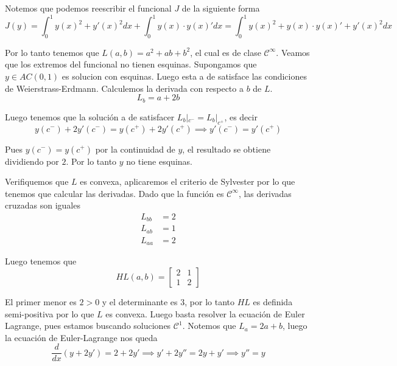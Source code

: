 \documentclass[a4paper,oneside,10.5pt]{USMArt}
\begin{document}
\begin{sol}
  Notemos que podemos reescribir el funcional $J$ de la siguiente forma
  \begin{equation*}
    J(y) = \int_{0}^{1} y(x)^{2} + y'(x)^{2} dx + \int_{0}^{1} y(x) \cdot y(x)' dx = \int_{0}^{1} y(x)^{2} + y(x) \cdot y(x)' + y'(x)^{2} dx
  \end{equation*}

  Por lo tanto tenemos que $L(a, b) = a^{2} + ab + b^{2}$, el cual es de clase $\mathcal{C}^{\infty}$. Veamos que los
  extremos del funcional no tienen esquinas. Supongamos que $y \in AC(0,1)$ es solucion con esquinas.
  Luego esta a de satisface las condiciones de Weierstrass-Erdmann. Calculemos la derivada con respecto a $b$ de $L$.
  \begin{equation*}
    L_{b} = a + 2b
  \end{equation*}


  Luego tenemos que la solución a de satisfacer $L_{b}|_{c^{-}} = L_{b}|_{c^{+}}$, es decir
  \begin{equation*}
    y(c^{-}) + 2y'(c^{-}) = y(c^{+}) + 2y'(c^{+}) \implies y'(c^{-}) = y'(c^{+})
  \end{equation*}

  Pues $y(c^{-}) = y(c^{+})$ por la continuidad de $y$, el resultado se obtiene dividiendo por $2$. Por lo tanto
  $y$ no tiene esquinas.

  Verifiquemos que $L$ es convexa, aplicaremos el criterio de Sylvester por lo que tenemos que calcular las derivadas.
  Dado que la función es $\mathcal{C}^{\infty}$, las derivadas cruzadas son iguales
  \begin{align*}
    L_{bb} &= 2\\
    L_{ab} &= 1\\
    L_{aa} &= 2
  \end{align*}

  Luego tenemos que
  \begin{equation*}
    HL(a, b) = \begin{bmatrix} 2 & 1\\ 1 & 2 \end{bmatrix}
  \end{equation*}

  El primer menor es $2 > 0$ y el determinante es $3$, por lo tanto $HL$ es definida semi-positiva por lo que $L$ es convexa.
  Luego basta resolver la ecuación de Euler Lagrange, pues estamos buscando soluciones $\mathcal{C}^{1}$. Notemos que $L_{a} = 2a + b$, luego la ecuación de Euler-Lagrange
  nos queda
  \begin{equation*}
    \frac{d}{dx}(y + 2y') = 2 + 2y' \implies y' + 2y'' = 2y + y' \implies y'' = y
  \end{equation*}


\end{sol}
\end{document}
